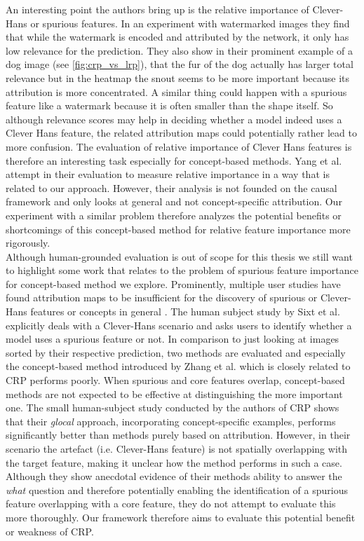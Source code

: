 An interesting point the authors bring up is the relative importance of Clever-Hans or spurious features. In an experiment with watermarked images they find that while the watermark is encoded and attributed by the network, it only has low relevance for the prediction. They also show in their prominent example of a dog image (see \cref{fig:crp_vs_lrp}), that the fur of the dog actually has larger total relevance but in the heatmap the snout seems to be more important because its attribution is more concentrated. A similar thing could happen with a spurious feature like a watermark because it is often smaller than the shape itself. So although relevance scores may help in deciding whether a model indeed uses a Clever Hans feature, the related attribution maps could potentially rather lead to more confusion.
The evaluation of relative importance of Clever Hans features is therefore an interesting task especially for concept-based methods. 
Yang et al. \cite{Yang2019} attempt in their evaluation to measure relative importance in a way that is related to our approach. However, their analysis is not founded on the causal framework and only looks at general and not concept-specific attribution. 
Our experiment with a similar problem therefore analyzes the potential benefits or shortcomings of this concept-based method for relative feature importance more rigorously. \\

Although human-grounded evaluation is out of scope for this thesis we still want to highlight some work that relates to the problem of spurious feature importance for concept-based method we explore. 
Prominently, multiple user studies have found attribution maps to be insufficient for the discovery of spurious or Clever-Hans features or concepts in general \cite{Sixt2022a,Rong2023,Kim2018}. 
The human subject study by Sixt et al. \cite{Sixt2022a} explicitly deals with a Clever-Hans scenario and asks users to identify whether a model uses a spurious feature or not. In comparison to just looking at images sorted by their respective prediction, two methods are evaluated and especially the concept-based method introduced by Zhang et al. \cite{Zhang2021} which is closely related to CRP performs poorly. When spurious and core features overlap, concept-based methods are not expected to be effective at distinguishing the more important one. The small human-subject study conducted by the authors of CRP \cite{Achtibat2023} shows that their \textit{glocal} approach, incorporating concept-specific examples, performs significantly better than methods purely based on attribution. However, in their scenario the artefact (i.e. Clever-Hans feature) is not spatially overlapping with the target feature, making it unclear how the method performs in such a case. Although they show anecdotal evidence of their methods ability to answer the \textit{what} question and therefore potentially enabling the identification of a spurious feature overlapping with a core feature, they do not attempt to evaluate this more thoroughly. Our framework therefore aims to evaluate this potential benefit or weakness of CRP. 

